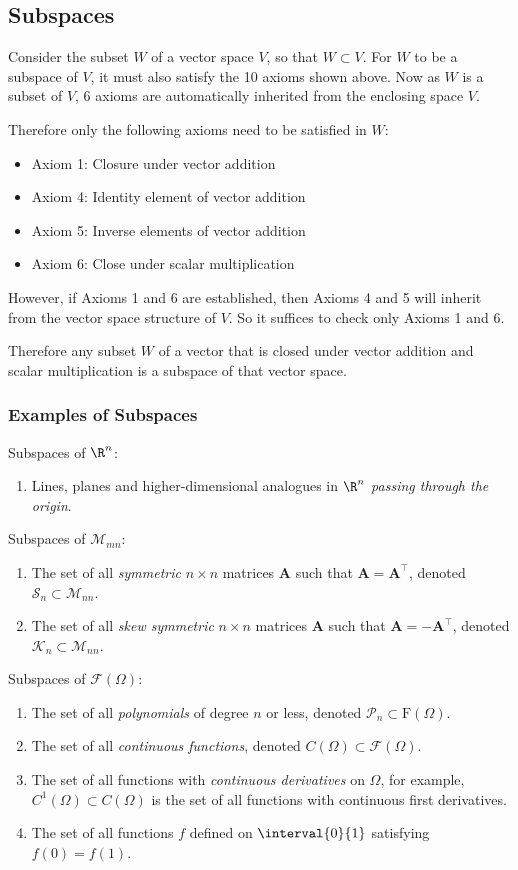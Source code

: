 \documentclass{article}
\begin{document}
\subsection{Subspaces}
Consider the subset \(W\) of a vector space \(V\), so that \(W \subset V\).
For \(W\) to be a subspace of \(V\), it must also satisfy the 10 axioms shown above.
Now as \(W\) is a subset of \(V\), 6 axioms are automatically inherited from the enclosing space \(V\).

Therefore only the following axioms need to be satisfied in \(W\):
\begin{itemize}
    \item Axiom 1: Closure under vector addition
    \item Axiom 4: Identity element of vector addition
    \item Axiom 5: Inverse elements of vector addition
    \item Axiom 6: Close under scalar multiplication
\end{itemize}
However, if Axioms 1 and 6 are established, then Axioms 4 and 5 will inherit from
the vector space structure of \(V\). So it suffices to check only Axioms 1 and 6.

Therefore any subset \(W\) of a vector that is closed under vector addition and scalar multiplication is a subspace
of that vector space.
\subsubsection{Examples of Subspaces}
Subspaces of \(\R^n\):
\begin{enumerate}
    \item Lines, planes and higher-dimensional analogues in \(\R^n\) \emph{passing through the origin}.
\end{enumerate}
Subspaces of \(\mathscr{M}_{mn}\):
\begin{enumerate}
    \item The set of all \emph{symmetric} \(n \times n\) matrices \(\symbf{A}\) such that \(\symbf{A} = \symbf{A}^\top\), denoted \(\mathscr{S}_n \subset \mathscr{M}_{nn}\).
    \item The set of all \emph{skew symmetric} \(n \times n\) matrices \(\symbf{A}\) such that \(\symbf{A} = -\symbf{A}^\top\), denoted \(\mathscr{K}_n \subset \mathscr{M}_{nn}\).
\end{enumerate}
Subspaces of \(\mathscr{F}\left( \Omega \right)\):
\begin{enumerate}
    \item The set of all \emph{polynomials} of degree \(n\) or less, denoted \(\mathscr{P}_n \subset \mathrm{F}\left( \Omega \right)\).
    \item The set of all \emph{continuous functions}, denoted \(C\left( \Omega \right) \subset \mathscr{F}\left( \Omega \right)\).
    \item The set of all functions with \emph{continuous derivatives} on \(\Omega\), for example, \(C^1\left( \Omega \right) \subset C\left( \Omega \right)\)
          is the set of all functions with continuous first derivatives.
    \item The set of all functions \(f\) defined on \(\interval{0}{1}\) satisfying \(f\left( 0 \right) = f\left( 1 \right)\).
\end{enumerate}
\end{document}
